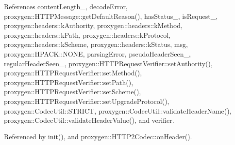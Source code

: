 References content\+Length\+\_\+, decode\+Error, proxygen\+::\+H\+T\+T\+P\+Message\+::get\+Default\+Reason(), has\+Status\+\_\+, is\+Request\+\_\+, proxygen\+::headers\+::k\+Authority, proxygen\+::headers\+::k\+Method, proxygen\+::headers\+::k\+Path, proxygen\+::headers\+::k\+Protocol, proxygen\+::headers\+::k\+Scheme, proxygen\+::headers\+::k\+Status, msg, proxygen\+::\+H\+P\+A\+C\+K\+::\+N\+O\+NE, parsing\+Error, pseudo\+Header\+Seen\+\_\+, regular\+Header\+Seen\+\_\+, proxygen\+::\+H\+T\+T\+P\+Request\+Verifier\+::set\+Authority(), proxygen\+::\+H\+T\+T\+P\+Request\+Verifier\+::set\+Method(), proxygen\+::\+H\+T\+T\+P\+Request\+Verifier\+::set\+Path(), proxygen\+::\+H\+T\+T\+P\+Request\+Verifier\+::set\+Scheme(), proxygen\+::\+H\+T\+T\+P\+Request\+Verifier\+::set\+Upgrade\+Protocol(), proxygen\+::\+Codec\+Util\+::\+S\+T\+R\+I\+CT, proxygen\+::\+Codec\+Util\+::validate\+Header\+Name(), proxygen\+::\+Codec\+Util\+::validate\+Header\+Value(), and verifier.



Referenced by init(), and proxygen\+::\+H\+T\+T\+P2\+Codec\+::on\+Header().


